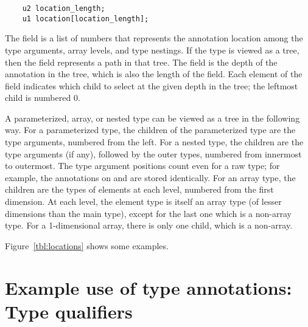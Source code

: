 \documentclass[10pt]{article}
\begin{document}

\preverbnegspace
\begin{Verbatim}
    u2 location_length;
    u1 location[location_length];
\end{Verbatim}

The  field is a list of numbers that represents the annotation
location among the type arguments, array levels, and type nestings.
If the type is viewed as a tree, then 
the  field represents a path in that tree.  The
 field is the depth of the annotation in the tree,
which is also the length of the  field.  Each element of the
 field indicates which child to select at the given depth in
the tree; the leftmost child is numbered 0.


A parameterized, array, or nested type can be viewed as a tree in the
following way.
%
For a parameterized type, the children of the parameterized type are the
type arguments, numbered from the left.
%
For a nested type, the children are the type arguments (if any), followed
by the outer types, numbered from innermost to outermost.
The type argument positions count even for a raw type; for
example, the annotations on  and  are stored identically.
%
For an array
type, the children are the types of elements at each level, numbered from
the first dimension.  At each level, the element type
is itself an array type (of lesser dimensions than the main type), except
for the last one which is a non-array type.  For a 1-dimensional array,
there is only one child, which is a non-array.


Figure~\ref{tbl:locations} shows some examples.



\label{page:non-normative-start}

\appendix

\section{Example use of type annotations:  Type qualifiers\label{type-qualifiers}}
\end{document}
